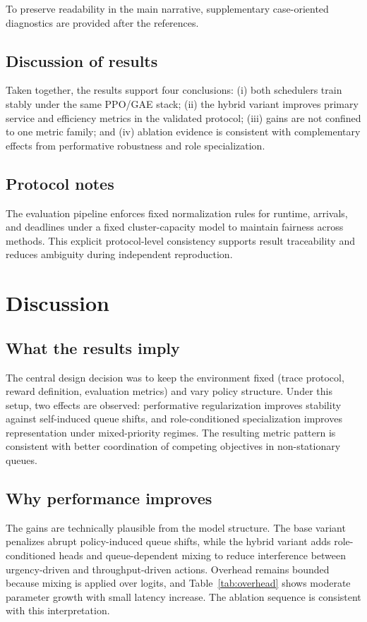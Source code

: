 \documentclass[journal]{IEEEtran}
\begin{document}
\noindent To preserve readability in the main narrative, supplementary case-oriented diagnostics are provided after the references.

\subsection{Discussion of results}
Taken together, the results support four conclusions: (i) both schedulers train stably under the same PPO/GAE stack; (ii) the hybrid variant improves primary service and efficiency metrics in the validated protocol; (iii) gains are not confined to one metric family; and (iv) ablation evidence is consistent with complementary effects from performative robustness and role specialization.

\subsection{Protocol notes}
The evaluation pipeline enforces fixed normalization rules for runtime, arrivals, and deadlines under a fixed cluster-capacity model to maintain fairness across methods. This explicit protocol-level consistency supports result traceability and reduces ambiguity during independent reproduction.

\section{\textbf{Discussion}} \label{Sec5}
\subsection{What the results imply}
The central design decision was to keep the environment fixed (trace protocol, reward definition, evaluation metrics) and vary policy structure. Under this setup, two effects are observed: performative regularization improves stability against self-induced queue shifts, and role-conditioned specialization improves representation under mixed-priority regimes. The resulting metric pattern is consistent with better coordination of competing objectives in non-stationary queues.

\subsection{Why performance improves}
The gains are technically plausible from the model structure. The base variant penalizes abrupt policy-induced queue shifts, while the hybrid variant adds role-conditioned heads and queue-dependent mixing to reduce interference between urgency-driven and throughput-driven actions. Overhead remains bounded because mixing is applied over logits, and Table~\ref{tab:overhead} shows moderate parameter growth with small latency increase. The ablation sequence is consistent with this interpretation.
\end{document}
